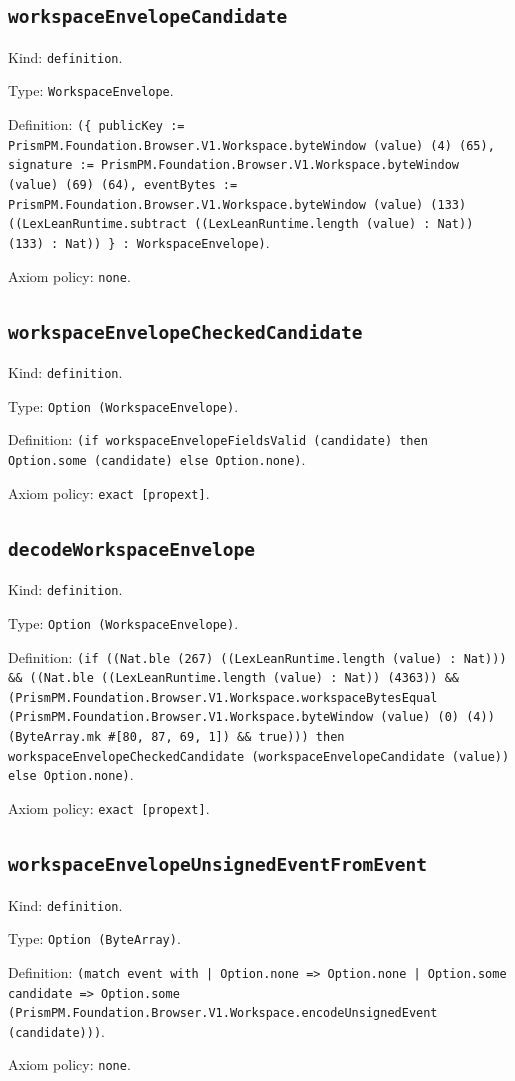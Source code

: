 \documentclass[11pt]{article}
\begin{document}
\subsection*{\texttt{workspaceEnvelopeCandidate}}
\noindent Kind: \texttt{definition}.\par
\noindent Type: \texttt{WorkspaceEnvelope}.\par
\noindent Definition: \texttt{(\{ publicKey := PrismPM.Foundation.Browser.V1.Workspace.byteWindow (value) (4) (65), signature := PrismPM.Foundation.Browser.V1.Workspace.byteWindow (value) (69) (64), eventBytes := PrismPM.Foundation.Browser.V1.Workspace.byteWindow (value) (133) ((LexLeanRuntime.subtract ((LexLeanRuntime.length (value) : Nat)) (133) : Nat)) \} : WorkspaceEnvelope)}.\par
\noindent Axiom policy: \texttt{none}.\par
\subsection*{\texttt{workspaceEnvelopeCheckedCandidate}}
\noindent Kind: \texttt{definition}.\par
\noindent Type: \texttt{Option (WorkspaceEnvelope)}.\par
\noindent Definition: \texttt{(if workspaceEnvelopeFieldsValid (candidate) then Option.some (candidate) else Option.none)}.\par
\noindent Axiom policy: \texttt{exact [propext]}.\par
\subsection*{\texttt{decodeWorkspaceEnvelope}}
\noindent Kind: \texttt{definition}.\par
\noindent Type: \texttt{Option (WorkspaceEnvelope)}.\par
\noindent Definition: \texttt{(if ((Nat.ble (267) ((LexLeanRuntime.length (value) : Nat))) \&\& ((Nat.ble ((LexLeanRuntime.length (value) : Nat)) (4363)) \&\& (PrismPM.Foundation.Browser.V1.Workspace.workspaceBytesEqual (PrismPM.Foundation.Browser.V1.Workspace.byteWindow (value) (0) (4)) (ByteArray.mk \#[80, 87, 69, 1]) \&\& true))) then workspaceEnvelopeCheckedCandidate (workspaceEnvelopeCandidate (value)) else Option.none)}.\par
\noindent Axiom policy: \texttt{exact [propext]}.\par
\subsection*{\texttt{workspaceEnvelopeUnsignedEventFromEvent}}
\noindent Kind: \texttt{definition}.\par
\noindent Type: \texttt{Option (ByteArray)}.\par
\noindent Definition: \texttt{(match event with | Option.none => Option.none | Option.some candidate => Option.some (PrismPM.Foundation.Browser.V1.Workspace.encodeUnsignedEvent (candidate)))}.\par
\noindent Axiom policy: \texttt{none}.\par
\end{document}
